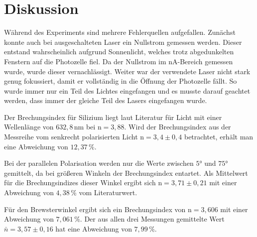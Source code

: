 \section{Diskussion}
\label{sec:Diskussion}

Während des Experiments sind mehrere Fehlerquellen aufgefallen. Zunächst konnte auch bei ausgeschalteten Laser ein Nullstrom gemessen werden. Dieser entstand wahrscheinlich aufgrund Sonnenlicht, welches trotz abgedunkelten Fenstern auf die Photozelle fiel.
Da der Nullstrom im $\unit{\nano \ampere}$-Bereich gemessen wurde, wurde dieser vernachlässigt.
Weiter war der verwendete Laser nicht stark genug fokussiert, damit er vollständig in die Öffnung der Photozelle fällt. 
So wurde immer nur ein Teil des Lichtes eingefangen und es musste darauf geachtet werden, dass immer der gleiche Teil des Lasers eingefangen wurde.


Der Brechungsindex für Silizium liegt laut Literatur \cite{ap02} für Licht mit einer Wellenlänge von $ 632,8 \, \unit{\nano\meter}$ bei $ \text{n} = 3,88 $.
Wird der Brechungsindex aus der Messreihe vom senkrecht polarisierten Licht $ \text{n} = 3,4 \pm 0,4 $ betrachtet, erhält man eine Abweichung von $ 12,37 \,\%$.


Bei der parallelen Polarisation werden nur die Werte zwischen $5° $ und $ 75°$ gemittelt, da bei größeren Winkeln der Brechungsindex entartet.
Als Mittelwert für die Brechungsindizes dieser Winkel ergibt sich $ \text{n} = 3,71 \pm 0,21 $ mit einer Abweichung von $ 4,38 \,\%$ vom Literaturwert.


Für den Brewsterwinkel ergibt sich ein Brechungsindex von $ \text{n} = 3,606 $ mit einer Abweichung von $ 7,061 \,\%$. Der aus allen drei Messungen gemittelte Wert $\bar{n} = 3,57 \pm 0,16$ hat eine Abweichung von $ 7,99 \,\%$.
